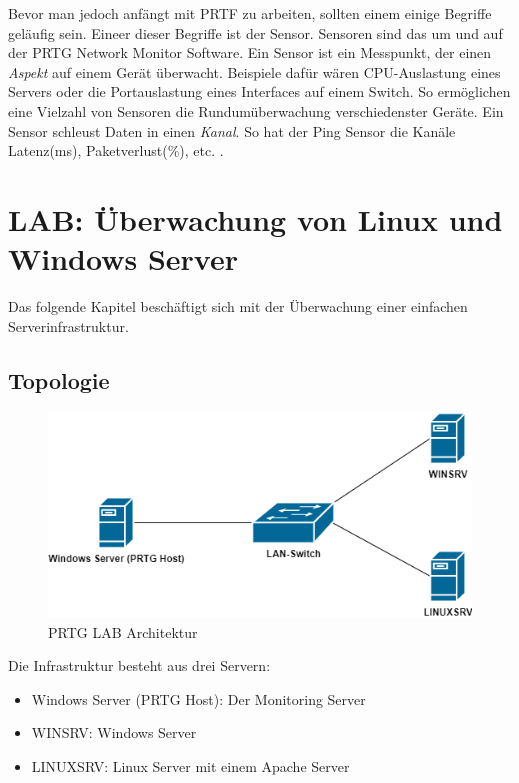 Bevor man jedoch anfängt mit PRTF zu arbeiten, sollten einem einige
Begriffe geläufig sein. Eineer dieser Begriffe ist der Sensor. Sensoren
sind das um und auf der PRTG Network Monitor Software. Ein Sensor ist
ein Messpunkt, der einen \emph{Aspekt} auf einem Gerät überwacht.
Beispiele dafür wären CPU-Auslastung eines Servers oder die
Portauslastung eines Interfaces auf einem Switch. So ermöglichen eine
Vielzahl von Sensoren die Rundumüberwachung verschiedenster Geräte. Ein
Sensor schleust Daten in einen \emph{Kanal}. So hat der Ping Sensor die
Kanäle Latenz(ms), Paketverlust(\%), etc. .

\hypertarget{lab-uxfcberwachung-von-linux-und-windows-server}{%
\section{LAB: Überwachung von Linux und Windows
Server}\label{lab-uxfcberwachung-von-linux-und-windows-server}}

Das folgende Kapitel beschäftigt sich mit der Überwachung einer
einfachen Serverinfrastruktur.

\hypertarget{topologie}{%
\subsection{Topologie}\label{topologie}}

\begin{figure}[!htb]
\centering
\includegraphics{./images/prtg_architektur.png}
\caption{PRTG LAB Architektur}
\end{figure}

Die Infrastruktur besteht aus drei Servern:

\begin{itemize}
\tightlist
\item
  Windows Server (PRTG Host): Der Monitoring Server
\item
  WINSRV: Windows Server
\item
  LINUXSRV: Linux Server mit einem Apache Server
\end{itemize}

